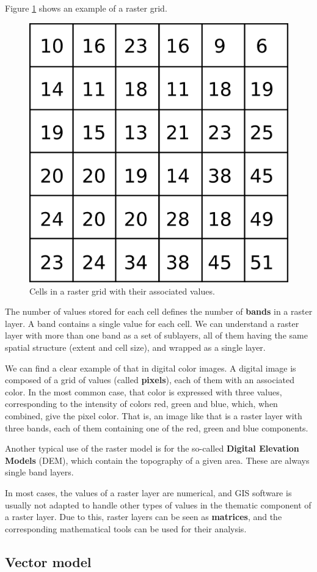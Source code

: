 Figure \ref{Fig:Raster_closeup} shows an example of a raster grid.

\begin{figure}[!hbt]   
\centering
\includegraphics[width=.4\textwidth]{Data/Raster_closeup.png}
\caption{\small Cells in a raster grid with their associated values.}
\label{Fig:Raster_closeup} 
\end{figure}

The number of values stored for each cell defines the number of \textbf{bands} in a raster layer. A band contains a single value for each cell. We can understand a raster layer with more than one band as a set of sublayers, all of them having the same spatial structure (extent and cell size), and wrapped as a single layer.

We can find a clear example of that in digital color images. A digital image is composed of a grid of values (called \textbf{pixels}), each of them with an associated color. In the most common case, that color is expressed with three values, corresponding to the intensity of colors red, green and blue, which, when combined, give the pixel color. That is, an image like that is a raster layer with three bands, each of them containing one of the red, green and blue components.

Another typical use of the raster model is for the so-called \textbf{Digital Elevation Models} (DEM), which contain the topography of a given area. These are always single band layers.

In most cases, the values of a raster layer are numerical, and GIS software is usually not adapted to handle other types of values in the thematic component of a raster layer. Due to this, raster layers can be seen as \textbf{matrices}, and the corresponding mathematical tools can be used for their analysis.


\subsection{Vector model}


